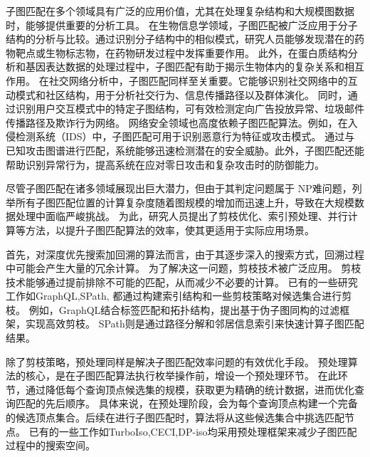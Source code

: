 子图匹配在多个领域具有广泛的应用价值，尤其在处理复杂结构和大规模图数据时，能够提供重要的分析工具。
在生物信息学领域，子图匹配被广泛应用于分子结构的分析与比较\cite{窦建凯2019单图中的近似频繁子图挖掘算法}。通过识别分子结构中的相似模式，研究人员能够发现潜在的药物靶点或生物标志物，在药物研发过程中发挥重要作用。
此外，在蛋白质结构分析和基因表达数据的处理过程中\cite{wang2023zerobind,biology-proteins-DBLP:journals/nar/XenariosSDHKE03,uniprot2017uniprot}，子图匹配有助于揭示生物体内的复杂关系和相互作用。
在社交网络分析中，子图匹配同样至关重要。它能够识别社交网络中的互动模式和社区结构，用于分析社交行为、信息传播路径以及群体演化\cite{wang2023mago}。
同时，通过识别用户交互模式中的特定子图结构，可有效检测定向广告投放异常、垃圾邮件传播路径及欺诈行为网络\cite{boshmaf2011socialbot,jiang2012isolating,wang2010don}。
网络安全领域也高度依赖子图匹配算法。例如，在入侵检测系统（IDS）中，子图匹配可用于识别恶意行为特征或攻击模式\cite{yuan2023motif}。
通过与已知攻击图谱进行匹配，系统能够迅速检测潜在的安全威胁。此外，子图匹配还能帮助识别异常行为，提高系统在应对零日攻击和复杂攻击时的防御能力。

尽管子图匹配在诸多领域展现出巨大潜力，但由于其判定问题属于 NP难问题，列举所有子图匹配位置的计算复杂度随着图规模的增加而迅速上升，导致在大规模数据处理中面临严峻挑战。
为此，研究人员提出了剪枝优化、索引预处理、并行计算等方法，以提升子图匹配算法的效率，使其更适用于实际应用场景。

首先，对深度优先搜索加回溯的算法而言，由于其逐步深入的搜索方式，回溯过程中可能会产生大量的冗余计算。
为了解决这一问题，剪枝技术被广泛应用。
剪枝技术能够通过提前排除不可能的匹配，从而减少不必要的计算。
已有的一些研究工作如GraphQL\cite{sm-GraphQL-DBLP:series/ads/HeS10},SPath\cite{sm-spath-DBLP:journals/pvldb/ZhaoH10},
都通过构建索引结构和一些剪枝策略对候选集合进行剪枝。
例如，GraphQL\cite{sm-GraphQL-DBLP:series/ads/HeS10}结合标签匹配和拓扑结构，提出基于伪子图同构的过滤框架，实现高效剪枝。
SPath\cite{sm-spath-DBLP:journals/pvldb/ZhaoH10}则是通过路径分解和邻居信息索引来快速计算子图匹配结果。

除了剪枝策略，预处理同样是解决子图匹配效率问题的有效优化手段。 
预处理算法的核心，是在子图匹配算法执行枚举操作前，增设一个预处理环节。
在此环节，通过降低每个查询顶点候选集的规模，获取更为精确的统计数据，进而优化查询匹配的先后顺序。
具体来说，在预处理阶段，会为每个查询顶点构建一个完备的候选顶点集合。后续在进行子图匹配时，算法将从这些候选集合中挑选匹配节点。
已有的一些工作如TurboIso\cite{sm-turbo-iso-DBLP:conf/sigmod/HanLL13},CECI\cite{sm-ceci-DBLP:conf/sigmod/BhattaraiLH19},DP-iso\cite{sm-dp-iso-DBLP:conf/sigmod/HanKGPH19}均采用预处理框架来减少子图匹配过程中的搜索空间。

